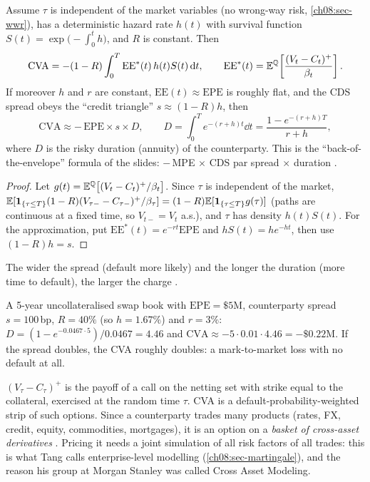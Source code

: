 \begin{paracol}{2}
\begin{proposition}\label{ch08:prop-cvaee}
Assume $\tau$ is independent of the market variables (no wrong-way risk, \cref{ch08:sec-wwr}), has a
deterministic hazard rate $h(t)$ with survival function $S(t)=\exp\bigl(-\int_0^th\bigr)$, and $R$ is constant.
Then
\[
  \mathrm{CVA} = -(1-R)\int_0^T \mathrm{EE}^*(t)\,h(t)S(t)\,\mathrm{d} t,\qquad
  \mathrm{EE}^*(t)=\mathbb{E}^{\mathbb{Q}}\!\left[\frac{(V_t-C_t)^+}{\beta_t}\right].
\]
If moreover $h$ and $r$ are constant, $\mathrm{EE}(t)\approx\mathrm{EPE}$ is roughly flat, and the CDS spread obeys
the ``credit triangle'' $s\approx(1-R)h$, then
\begin{equation}\label{ch08:eq-cvabote}
  \mathrm{CVA}\approx-\,\mathrm{EPE}\times s\times D,\qquad D=\int_0^Te^{-(r+h)t}\dd t=\frac{1-e^{-(r+h)T}}{r+h},
\end{equation}
where $D$ is the risky duration (annuity) of the counterparty. This is the ``back-of-the-envelope'' formula of
the slides: $-\,$MPE $\times$ CDS par spread $\times$ duration .
\end{proposition}
\begin{proof}
Let $g(t)=\mathbb{E}^{\mathbb{Q}}\bigl[(V_t-C_t)^+/\beta_t\bigr]$. Since $\tau$ is independent of the market,
$\mathbb{E}[\mathbf{1}_{\{\tau\le T\}}(1-R)(V_{\tau-}-C_{\tau-})^+/\beta_\tau]=(1-R)\mathbb{E}[\mathbf{1}_{\{\tau\le T\}}g(\tau)]$ (paths are
continuous at a fixed time, so $V_{t-}=V_t$ a.s.), and $\tau$ has density $h(t)S(t)$. For the approximation, put
$\mathrm{EE}^*(t)=e^{-rt}\mathrm{EPE}$ and $hS(t)=he^{-ht}$, then use $(1-R)h=s$.
\end{proof}
The wider the spread (default more likely) and the longer the duration (more time to default), the larger the
charge .

\begin{example}
A 5-year uncollateralised swap book with $\mathrm{EPE}=\$5$M, counterparty spread $s=100$\,bp, $R=40\%$ (so
$h=1.67\%$) and $r=3\%$: $D=(1-e^{-0.0467\cdot5})/0.0467=4.46$ and $\mathrm{CVA}\approx-5\cdot0.01\cdot4.46
=-\$0.22$M. If the spread doubles, the CVA roughly doubles: a mark-to-market loss with no default at all.
\end{example}

\begin{intuition}
$(V_\tau-C_\tau)^+$ is the payoff of a call on the netting set with strike equal to the collateral, exercised at
the random time $\tau$. CVA is a default-probability-weighted strip of such options. Since a counterparty trades
many products (rates, FX, credit, equity, commodities, mortgages), it is an option on a \emph{basket of cross-asset
derivatives} . Pricing it needs a joint simulation of all risk factors of all trades: this is
what Tang calls enterprise-level modelling (\cref{ch08:sec-martingale}), and the reason his group at Morgan Stanley
was called Cross Asset Modeling.
\end{intuition}


\end{paracol}
